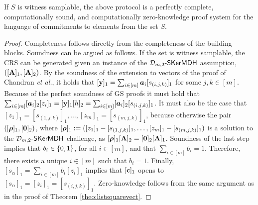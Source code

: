 \begin{theorem}
If $S$ is witness samplable, the above protocol is a perfectly complete, computationally sound, and computationally zero-knowledge proof system for the language of commitments to elements from the set $S$.
\end{theorem}

\begin{proof} Completeness follows directly from the completeness of the 
building blocks.  Soundness can be argued as follows. If the set is witness samplable, the CRS can be generated given an instance of the $\mathcal{D}_{m,2}\mbox{-}\mathsf{SKerMDH}$ assumption, $([\mathbf{{A}}]_1, [\mathbf{{A}}]_2)$. By the soundness of the extension to vectors of the proof of Chandran \textit{et al.}, it holds that $[\mathbf{y}]_1 = \sum_{i\in[m]}{\boldsymbol a}_i[s_{(i,j,k)}]_1$ for some $j,k\in[m]$.
Because of the perfect soundness of GS proofs it must hold that $\sum_{i\in[m]}[{\boldsymbol a}_i]_2[z_i]_1=[\mathbf{y}]_1[h]_2=\sum_{i\in[m]}[{\boldsymbol a}_i]_2[s_{(i,j,k)}]_1$. It must also be the case that $[z_1]_1=[s_{(1,j,k)}]_1,\allowbreak\ldots,[z_m]_1=[s_{(m,j,k)}]_1$, because otherwise the pair $([{\boldsymbol \rho}]_1,[{\boldsymbol 0}]_2)$, where 
$[{\boldsymbol \rho}]_1:=([z_1]_1-[s_{(1,j,k)}]_1,\allowbreak\ldots,[z_m]_1-[s_{(m,j,k)}]_1)$ is a solution to the $\mathcal{D}_{m,2}\mbox{-}\mathsf{SKerMDH}$ challenge, as $[{\boldsymbol \rho}]_1[\mathbf{{A}}]_2=[{\boldsymbol 0}]_2[\mathbf{{A}}]_1$. Soundness of the last step implies that $b_i\in\{0,1\}$, for all $i\in[m]$, and that $\sum_{i\in[m]} b_i=1$. Therefore, there exists a unique $i\in[m]$ such that $b_i=1$. Finally, $[s_{\alpha}]_1=\sum_{i\in[m]}b_i[z_i]_1$ implies that $[\mathbf{c}]_1$ opens to $[s_{\alpha}]_1=[z_i]_1=[s_{(i,j,k)}]_1$.
Zero-knowledge follows from the same argument as in the proof of Theorem \ref{theo:listsquarevect}.
\end{proof} 

